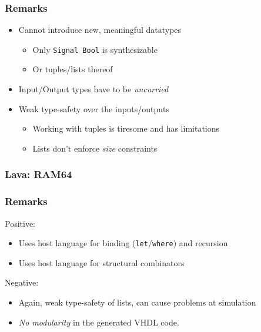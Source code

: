 \documentclass{beamer}
\begin{document}
            \begin{frame}
                \frametitle{Remarks}

                \begin{itemize}
                    \item Cannot introduce new, meaningful datatypes
                        \begin{itemize}
                            \item Only \texttt{Signal Bool} is synthesizable
                            \item Or tuples/lists thereof
                        \end{itemize}
                    \item Input/Output types have to be \emph{uncurried}
                    \item Weak type-safety over the inputs/outputs
                        \begin{itemize}
                            \item Working with tuples is tiresome and has limitations
                            \item Lists don't enforce \emph{size} constraints
                        \end{itemize}
                \end{itemize}
            \end{frame}

            \begin{frame}
                \frametitle{Lava: RAM64}
            \end{frame}

            \begin{frame}
                \frametitle{Remarks}

                \par{Positive:}
                \begin{itemize}
                    \item Uses host language for binding (\texttt{let}/\texttt{where}) and recursion
                    \item Uses host language for structural combinators
                \end{itemize}

                \par{Negative:}
                \begin{itemize}
                    \item Again, weak type-safety of lists, can cause problems at simulation
                    \item \emph{No modularity} in the generated VHDL code.
                \end{itemize}
            \end{frame}
\end{document}
